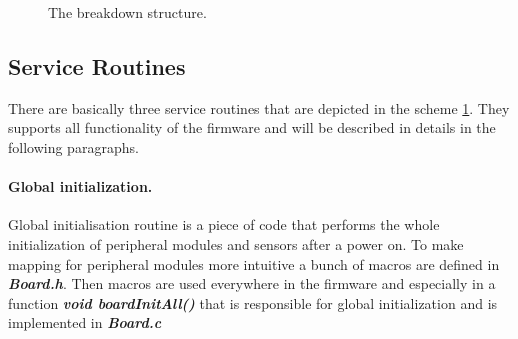 \documentclass[a4paper,12pt]{article} %
\begin{document}
\begin{figure}[H]
\caption{The breakdown structure.}
\label{ris:scheme}
\end{figure}

\subsection{Service Routines}
There are basically three service routines that are depicted in the scheme \ref{ris:scheme}. They supports all functionality of the firmware and will be described in details in the following paragraphs. 

\paragraph{Global initialization.}

Global initialisation routine is a piece of code that performs the whole initialization of peripheral modules and sensors after a power on. To make mapping for peripheral modules more intuitive a bunch of macros are defined in \textbf{\textit{Board.h}}. Then macros are used everywhere in the firmware and especially in a function \textbf{\textit{void boardInitAll()}} that is responsible for global initialization and is implemented in \textbf{\textit{Board.c}}
\end{document}
